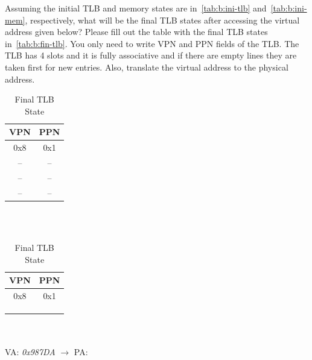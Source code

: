 \documentclass[addpoints, 12pt, answers]{exam}
\begin{document}
\begin{questions}
\begin{parts}
Assuming the initial TLB and memory states are in~\autoref{tab:b:ini-tlb} and~\autoref{tab:b:ini-mem}, respectively, 
what will be the final TLB states after accessing the virtual address given below? 
Please fill out the table with the final TLB states in~\autoref{tab:b:fin-tlb}.  
You only need to write VPN and PPN fields of the TLB. 
The TLB has 4 slots and it is fully associative and 
if there are empty lines they are taken first for new entries. 
Also, translate the virtual address to the physical address.

\begin{table}[H]
	\begin{minipage}[t]{0.6\linewidth}
		\centering
		\caption{Initial TLB State}\label{tab:b:ini-tlb}
		\begin{tabular}{|c|c|}
		\hline
		\quad VPN \quad\quad & \quad PPN \quad\quad \\ \hline
		0x8 & 0x1 \\ \hline
		-- & -- \\ \hline
		-- & -- \\ \hline
		-- & -- \\ \hline
		\end{tabular}


		\quad\\ \quad\\

		\caption{Final TLB State}\label{tab:b:fin-tlb}
		\begin{tabular}{|c|c|}
		\hline
		\quad VPN \quad\quad& \quad PPN \quad\quad\\ \hline
		0x8 & 0x1 \\ \hline
		 &  \\ \hline
		 &  \\ \hline
		 &  \\ \hline
		\end{tabular}


		\quad\\ \quad\\


		VA: {\em 0x987DA} $\longrightarrow$ PA: \underline{\quad\quad\quad\quad\quad\quad\quad\quad}



\end{minipage}
\end{table}
\end{parts}
\end{questions}
\end{document}
